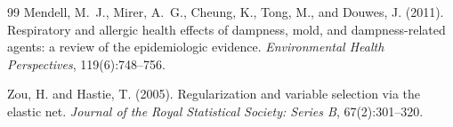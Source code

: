 \documentclass[11pt,letterpaper]{article}
\begin{document}
\begin{thebibliography}{99}
Mendell, M.~J., Mirer, A.~G., Cheung, K., Tong, M., and Douwes, J. (2011).
\newblock Respiratory and allergic health effects of dampness, mold, and dampness-related agents: a review of the epidemiologic evidence.
\newblock \emph{Environmental Health Perspectives}, 119(6):748--756.

Zou, H. and Hastie, T. (2005).
\newblock Regularization and variable selection via the elastic net.
\newblock \emph{Journal of the Royal Statistical Society: Series B}, 67(2):301--320.

\end{thebibliography}
\end{document}
